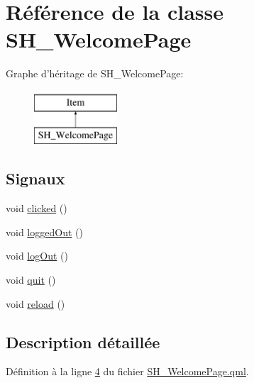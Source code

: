 \hypertarget{classSH__WelcomePage}{\section{Référence de la classe S\-H\-\_\-\-Welcome\-Page}
\label{classSH__WelcomePage}
}
Graphe d'héritage de S\-H\-\_\-\-Welcome\-Page\-:\begin{figure}[H]
\begin{center}
\leavevmode
\includegraphics[height=2.000000cm]{classSH__WelcomePage}
\end{center}
\end{figure}
\subsection*{Signaux}
\begin{DoxyCompactItemize}
\item 
void \hyperlink{classSH__WelcomePage_ade32805350cd52bc84195cd3f5e2d842}{clicked} ()
\item 
void \hyperlink{classSH__WelcomePage_a0d6f94c400b567418f49fce4eab0fa2a}{logged\-Out} ()
\item 
void \hyperlink{classSH__WelcomePage_a5393010ddb7d9a8fba6486d979a0cf38}{log\-Out} ()
\item 
void \hyperlink{classSH__WelcomePage_add4c38249bbc1cdf0d3ff7aed9049a6f}{quit} ()
\item 
void \hyperlink{classSH__WelcomePage_aa839ab56913f730ddd457e14fca1adf3}{reload} ()
\end{DoxyCompactItemize}


\subsection{Description détaillée}


Définition à la ligne \hyperlink{SH__WelcomePage_8qml_source_l00004}{4} du fichier \hyperlink{SH__WelcomePage_8qml_source}{S\-H\-\_\-\-Welcome\-Page.\-qml}.



